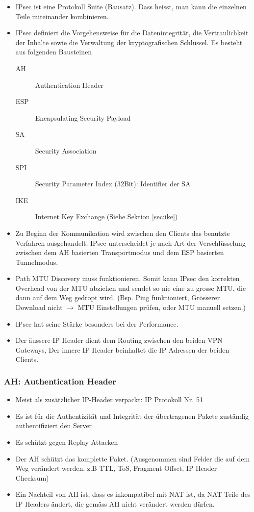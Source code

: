 \begin{itemize}
	\item IPsec ist eine Protokoll Suite (Bausatz). Dass heisst, man kann die einzelnen Teile miteinander kombinieren.
	\item IPsec definiert die Vorgehensweise für die Datenintegrität, die Vertraulichkeit der Inhalte sowie die Verwaltung der kryptografischen Schlüssel. Es besteht aus folgenden Bausteinen
	\begin{description}
		\item[AH] Authentication Header
		\item[ESP] Encapsulating Security Payload
		\item[SA] Security Association
		\item[SPI] Security Parameter Index (32Bit): Identifier der SA
		\item[IKE] Internet Key Exchange (Siehe Sektion \ref{sec:ike})
	\end{description}
	\item Zu Beginn der Kommunikation wird zwischen den Clients das benutzte Verfahren ausgehandelt. IPsec unterscheidet je nach Art der Verschlüsselung zwischen dem AH basierten Transportmodus und dem ESP basierten Tunnelmodus.
	\item Path MTU Discovery muss funktionieren. Somit kann IPsec den korrekten Overhead von der MTU abziehen und sendet so nie eine zu grosse MTU, die dann auf dem Weg gedropt wird. (Bsp. Ping funktioniert, Grösserer Download nicht $\rightarrow$ MTU Einstellungen prüfen, oder MTU manuell setzen.)
	\item IPsec hat seine Stärke besonders bei der Performance.
	\item Der äussere IP Header dient dem Routing zwischen den beiden VPN Gateways, Der innere IP Header beinhaltet die IP Adressen der beiden Clients.
\end{itemize}

\clearpage

\subsubsection{AH: Authentication Header}
\begin{itemize}
	\item Meist als zusätzlicher IP-Header verpackt: IP Protokoll Nr. 51
	\item Es ist für die Authentizität und Integrität der übertragenen Pakete zuständig authentifiziert den Server
	\item Es schützt gegen Replay Attacken
	\item Der AH schützt das komplette Paket. (Ausgenommen sind Felder die auf dem Weg verändert werden. z.B TTL, ToS, Fragment Offset, IP Header Checksum)
	\item Ein Nachteil von AH ist, dass es inkompatibel mit NAT ist, da NAT Teile des IP Headers ändert, die gemäss AH nicht verändert werden dürfen.
\end{itemize}


